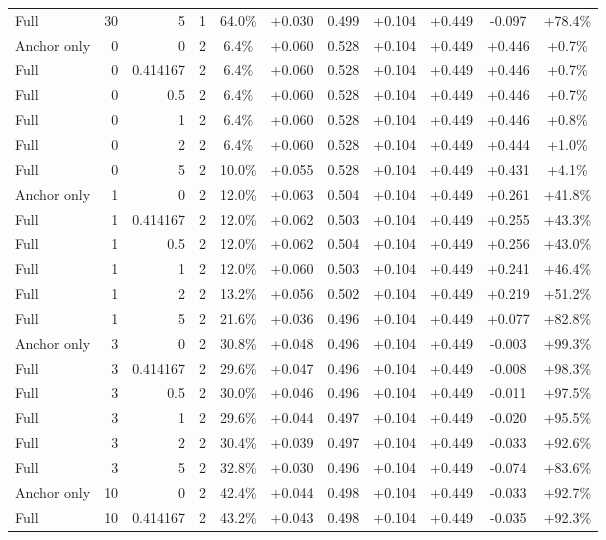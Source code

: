 \begin{table}[htbp]
\begin{tabular}{lrrrccccccc}
Full & 30 & 5 & 1 & 64.0\% & +0.030 & 0.499 & +0.104 & +0.449 & -0.097 & +78.4\% \\
Anchor only & 0 & 0 & 2 & 6.4\% & +0.060 & 0.528 & +0.104 & +0.449 & +0.446 & +0.7\% \\
Full & 0 & 0.414167 & 2 & 6.4\% & +0.060 & 0.528 & +0.104 & +0.449 & +0.446 & +0.7\% \\
Full & 0 & 0.5 & 2 & 6.4\% & +0.060 & 0.528 & +0.104 & +0.449 & +0.446 & +0.7\% \\
Full & 0 & 1 & 2 & 6.4\% & +0.060 & 0.528 & +0.104 & +0.449 & +0.446 & +0.8\% \\
Full & 0 & 2 & 2 & 6.4\% & +0.060 & 0.528 & +0.104 & +0.449 & +0.444 & +1.0\% \\
Full & 0 & 5 & 2 & 10.0\% & +0.055 & 0.528 & +0.104 & +0.449 & +0.431 & +4.1\% \\
Anchor only & 1 & 0 & 2 & 12.0\% & +0.063 & 0.504 & +0.104 & +0.449 & +0.261 & +41.8\% \\
Full & 1 & 0.414167 & 2 & 12.0\% & +0.062 & 0.503 & +0.104 & +0.449 & +0.255 & +43.3\% \\
Full & 1 & 0.5 & 2 & 12.0\% & +0.062 & 0.504 & +0.104 & +0.449 & +0.256 & +43.0\% \\
Full & 1 & 1 & 2 & 12.0\% & +0.060 & 0.503 & +0.104 & +0.449 & +0.241 & +46.4\% \\
Full & 1 & 2 & 2 & 13.2\% & +0.056 & 0.502 & +0.104 & +0.449 & +0.219 & +51.2\% \\
Full & 1 & 5 & 2 & 21.6\% & +0.036 & 0.496 & +0.104 & +0.449 & +0.077 & +82.8\% \\
Anchor only & 3 & 0 & 2 & 30.8\% & +0.048 & 0.496 & +0.104 & +0.449 & -0.003 & +99.3\% \\
Full & 3 & 0.414167 & 2 & 29.6\% & +0.047 & 0.496 & +0.104 & +0.449 & -0.008 & +98.3\% \\
Full & 3 & 0.5 & 2 & 30.0\% & +0.046 & 0.496 & +0.104 & +0.449 & -0.011 & +97.5\% \\
Full & 3 & 1 & 2 & 29.6\% & +0.044 & 0.497 & +0.104 & +0.449 & -0.020 & +95.5\% \\
Full & 3 & 2 & 2 & 30.4\% & +0.039 & 0.497 & +0.104 & +0.449 & -0.033 & +92.6\% \\
Full & 3 & 5 & 2 & 32.8\% & +0.030 & 0.496 & +0.104 & +0.449 & -0.074 & +83.6\% \\
Anchor only & 10 & 0 & 2 & 42.4\% & +0.044 & 0.498 & +0.104 & +0.449 & -0.033 & +92.7\% \\
Full & 10 & 0.414167 & 2 & 43.2\% & +0.043 & 0.498 & +0.104 & +0.449 & -0.035 & +92.3\% \\

\end{tabular}
\end{table}
